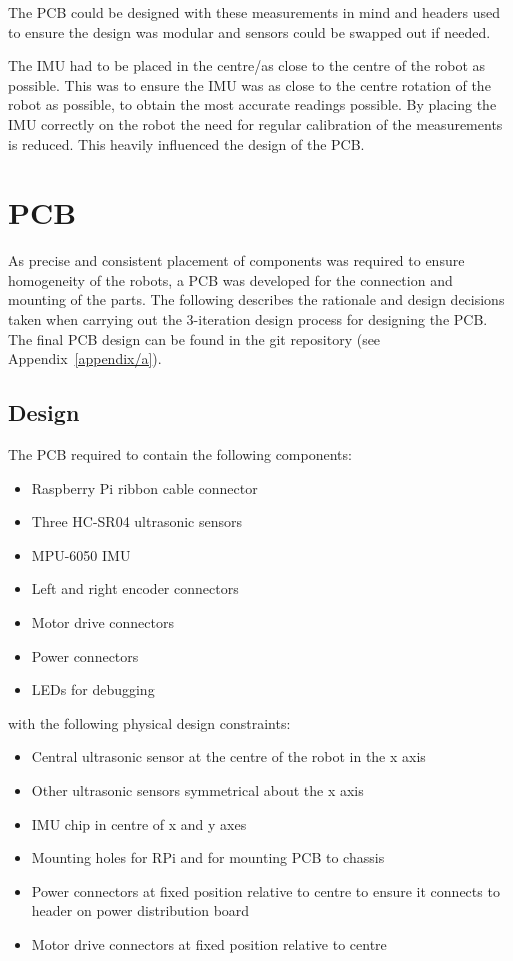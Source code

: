 The PCB could be designed with these measurements 
in mind and headers used to ensure the design 
was modular and sensors could be swapped out if needed. 

The IMU had to be placed in the centre/as 
close to the centre of the robot as possible. This was to ensure the 
IMU was as close to the centre rotation of the robot as possible, to 
obtain the most accurate readings possible. By placing the IMU correctly 
on the robot the need for regular calibration of the measurements is 
reduced. This heavily influenced the design of the PCB. 


\section{PCB}\label{elec/pcb}
As precise and consistent placement of components was required to ensure
homogeneity of the robots, a PCB was developed for the connection
and mounting of the parts. The following
describes the rationale and design decisions taken when carrying out the
3-iteration design process for designing the PCB. The final PCB design can
be found in the git repository (see Appendix~\ref{appendix/a}).

\subsection{Design}\label{elec/pcb/design}
The PCB required to contain the following components:
\begin{itemize}
  \item Raspberry Pi ribbon cable connector
  \item Three HC-SR04 ultrasonic sensors
  \item MPU-6050 IMU
  \item Left and right encoder connectors
  \item Motor drive connectors
  \item Power connectors
  \item LEDs for debugging
\end{itemize}

with the following physical design constraints:

\begin{itemize}
  \item Central ultrasonic sensor at the centre of the robot in the x axis
  \item Other ultrasonic sensors symmetrical about the x axis
  \item IMU chip in centre of x and y axes
  \item Mounting holes for RPi and for mounting PCB to chassis
  \item Power connectors at fixed position relative to centre to ensure it
  connects to header on power distribution board
  \item Motor drive connectors at fixed position relative to centre
\end{itemize}

